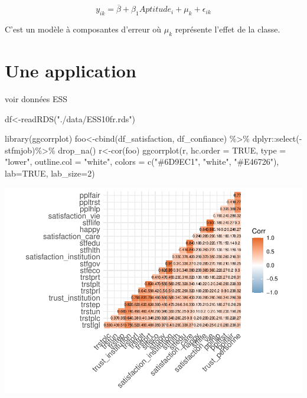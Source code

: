 \documentclass[
]{book}
\newenvironment{Shaded}{\begin{snugshade}}{\end{snugshade}}
\newcommand{\AttributeTok}[1]{\textcolor[rgb]{0.77,0.63,0.00}{#1}}
\newcommand{\ConstantTok}[1]{\textcolor[rgb]{0.00,0.00,0.00}{#1}}
\newcommand{\DecValTok}[1]{\textcolor[rgb]{0.00,0.00,0.81}{#1}}
\newcommand{\FunctionTok}[1]{\textcolor[rgb]{0.00,0.00,0.00}{#1}}
\newcommand{\NormalTok}[1]{#1}
\newcommand{\OtherTok}[1]{\textcolor[rgb]{0.56,0.35,0.01}{#1}}
\newcommand{\SpecialCharTok}[1]{\textcolor[rgb]{0.00,0.00,0.00}{#1}}
\newcommand{\StringTok}[1]{\textcolor[rgb]{0.31,0.60,0.02}{#1}}
\begin{document}
\[y_{ik}=\overline{\beta}+\beta_{1}Aptitude_{i}+\mu_{k}+\epsilon_{ik} \]

C'est un modèle à composantes d'erreur où \(\mu_{k}\) représente l'effet de la classe.

\hypertarget{une-application}{%
\section{Une application}\label{une-application}}

voir données ESS

\begin{Shaded}
\begin{Highlighting}[]
\NormalTok{df}\OtherTok{\textless{}{-}}\FunctionTok{readRDS}\NormalTok{(}\StringTok{"./data/ESS10fr.rds"}\NormalTok{)}
\end{Highlighting}
\end{Shaded}

\begin{Shaded}
\begin{Highlighting}[]
\FunctionTok{library}\NormalTok{(ggcorrplot)}
\NormalTok{foo}\OtherTok{\textless{}{-}}\FunctionTok{cbind}\NormalTok{(df\_satisfaction, df\_confiance) }\SpecialCharTok{\%\textgreater{}\%}
\NormalTok{  dplyr}\SpecialCharTok{::}\FunctionTok{select}\NormalTok{(}\SpecialCharTok{{-}}\NormalTok{stfmjob)}\SpecialCharTok{\%\textgreater{}\%}
  \FunctionTok{drop\_na}\NormalTok{()}
\NormalTok{r}\OtherTok{\textless{}{-}}\FunctionTok{cor}\NormalTok{(foo)}
\FunctionTok{ggcorrplot}\NormalTok{(r, }\AttributeTok{hc.order =} \ConstantTok{TRUE}\NormalTok{, }\AttributeTok{type =} \StringTok{"lower"}\NormalTok{,}
   \AttributeTok{outline.col =} \StringTok{"white"}\NormalTok{,}
   \AttributeTok{colors =} \FunctionTok{c}\NormalTok{(}\StringTok{"\#6D9EC1"}\NormalTok{, }\StringTok{"white"}\NormalTok{, }\StringTok{"\#E46726"}\NormalTok{), }\AttributeTok{lab=}\ConstantTok{TRUE}\NormalTok{, }\AttributeTok{lab\_size=}\DecValTok{2}\NormalTok{)}
\end{Highlighting}
\end{Shaded}

\includegraphics{bookdown-demo_files/figure-latex/1103-1.pdf}
\end{document}
